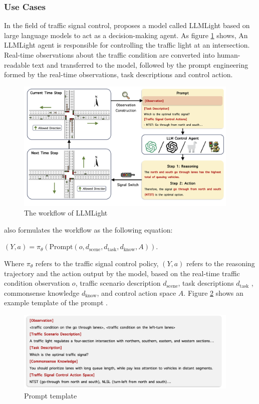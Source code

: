 \documentclass[runningheads]{llncs}
\begin{document}
\subsubsection{Use Cases}
\noindent \newline
In the field of traffic signal control, \cite{Lai23} proposes a model called LLMLight based on large language models to act as a decision-making agent. As figure \ref{fig:llmlight} shows,
An LLMLight agent is responsible for controlling the traffic light at an intersection. Real-time observations about the traffic condition are converted into human-readable text and transferred to 
the model, followed by the prompt engineering formed by the real-time observations, task descriptions and control action.
\begin{figure}[htbp]
  \centering
  \includegraphics[width=0.95\textwidth]{LLMLight.PNG}
  \caption{The workflow of LLMLight \cite{Lai23}}
  \label{fig:llmlight}
\end{figure}
\cite{Lai23} also formulates the workflow as the following equation:
\begin{definition}
  $(Y, a) = \pi_{\theta}(\text{Prompt}(o, d_{\text{scene}}, d_{\text{task}}, d_{\text{know}}, A))$.
\end{definition}
Where $\pi_{\theta}$ refers to the traffic signal control policy, $(Y, a)$ refers to the reasoning trajectory and the action output by the model,
based on the real-time traffic condition observation $o$, traffic scenario description $d_{\text{scene}}$, task descriptions $d_{\text{task}}$ , commonsense knowledge $d_{\text{know}}$, and control action space $A$.
Figure \ref{fig:llmlight_prompt} shows an example template of the prompt \cite{Lai23}.
\begin{figure}[htbp]
  \centering
  \includegraphics[width=0.95\textwidth]{Prompt LLMLight.PNG}
  \caption{Prompt template \cite{Lai23}}
  \label{fig:llmlight_prompt}
\end{figure} \\
\end{document}
